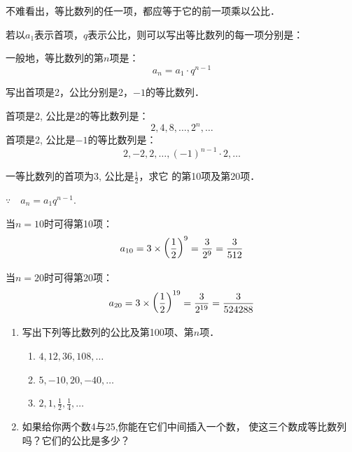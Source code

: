 不难看出，等比数列的任一项，都应等于它的前一项乘以公比．

若以$a_1$表示首项，$q$表示公比，则可以写出等比数列的每一项分别是：
\begin{center}
   \end{center}

一般地，等比数列的第$n$项是：
\[a_n=a_1\cdot q^{n-1}\]

\begin{example}
写出首项是2，公比分别是2，$-1$的等比数列．
\end{example}

\begin{solution}
首项是2, 公比是2的等比数列是：
\[2, 4, 8, \ldots , 2^n, \ldots \]
首项是2, 公比是$-1$的等比数列是：
\[2, -2, 2, \ldots, (-1)^{n-1}\cdot 2,\ldots\]
\end{solution}

\begin{example}
    一等比数列的首项为3, 公比是$\frac{1}{2}$，求它
的第10项及第20项．
\end{example}

\begin{solution}
   $\because\quad  a_n=a_1q^{n-1}$.

当$n=10$时可得第10项：
\[a_{10}=3\times\left(\dfrac{1}{2}\right)^9=\dfrac{3}{2^9}=\dfrac{3}{512}\]

当$n=20$时可得第20项：
\[a_{20}=3\times\left(\dfrac{1}{2}\right)^{19}=\dfrac{3}{2^{19}}=\dfrac{3}{524288}\]
\end{solution}


\begin{ex}
\begin{enumerate}
    \item 写出下列等比数列的公比及第100项、第$n$项．
    \begin{enumerate}
        \item $4, 12, 36, 108,\ldots$
        \item $5, -10, 20,-40,\ldots$
        \item $2, 1, \frac{1}{2}, \frac{1}{4},\ldots$
    \end{enumerate}

    \item 如果给你两个数4与25,你能在它们中间插入一个数，
    使这三个数成等比数列吗？它们的公比是多少？
\end{enumerate}    
\end{ex}

